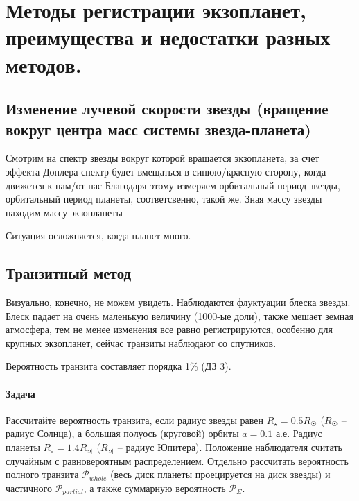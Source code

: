 \section{Методы регистрации экзопланет, преимущества и недостатки разных методов.}
\subsection{Изменение лучевой скорости звезды (вращение вокруг центра масс системы звезда-планета)
}
Смотрим на спектр звезды вокруг которой вращается экзопланета, за счет эффекта Доплера спектр будет вмещаться в синюю/красную сторону, когда движется к нам/от нас 
Благодаря этому измеряем орбитальный период звезды, орбитальный период планеты, соответсвенно, такой же. Зная массу звезды находим массу экзопланеты

Ситуация осложняется, когда планет много. 
\subsection{Транзитный метод}
Визуально, конечно, не можем увидеть. Наблюдаются флуктуации блеска звезды. Блеск падает на очень маленькую величину (1000-ые доли), также мешает земная атмосфера, тем не менее изменения все равно регистрируются, особенно для крупных экзопланет, сейчас транзиты наблюдают со спутников.

Вероятность транзита составляет порядка 1\% (ДЗ 3).

\paragraph{Задача}
Рассчитайте вероятность транзита, если радиус звезды равен $R_{\star} = 0.5 R_{\Sun}$ ($R_{\Sun}$ -- радиус Солнца),
а большая полуось (круговой) орбиты $a = 0.1$ а.е. Радиус планеты $R_{\circ} = 1.4R_{\Jupiter}$ ($R_{\Jupiter}$ -- радиус
Юпитера). 
Положение наблюдателя считать случайным с равновероятным распределением. Отдельно рассчитать вероятность полного транзита $\mathcal{P}_{whole}$ (весь диск планеты проецируется на диск звезды) и частичного $\mathcal{P}_{partial}$, а также суммарную вероятность $\mathcal{P}_{\Sigma}$.
